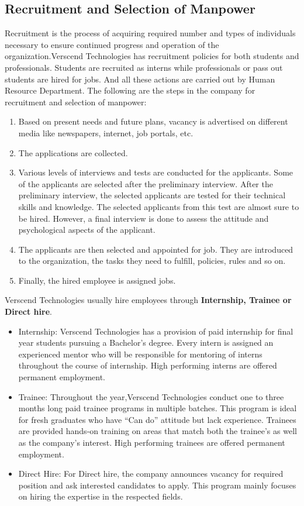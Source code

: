 \subsection{Recruitment and Selection of Manpower}
Recruitment is the process of acquiring required number and types of individuals necessary to ensure
continued progress and operation of the organization.Verscend Technologies has recruitment
policies for both students and professionals. Students are recruited as interns while professionals or pass out
students are hired for jobs. And all these actions are carried out by Human Resource Department. The
following are the steps in the company for recruitment and selection of manpower:
\begin{enumerate}
\item  Based on present needs and future plans, vacancy is advertised on different media like newspapers,
internet, job portals, etc.
\item  The applications are collected.
\item  Various levels of interviews and tests are conducted for the applicants. Some of the applicants are
selected after the preliminary interview. After the preliminary interview, the selected applicants are
tested for their technical skills and knowledge. The selected applicants from this test are almost sure
to be hired. However, a final interview is done to assess the attitude and psychological aspects of
the applicant.
\item  The applicants are then selected and appointed for job. They are introduced to the organization, the
tasks they need to fulfill, policies, rules and so on.
\item  Finally, the hired employee is assigned jobs.
\end{enumerate}
Verscend Technologies usually hire employees through \textbf{Internship, Trainee or Direct hire}.
\begin{itemize}
\item Internship: Verscend Technologies has a provision of paid internship for final year students
pursuing a Bachelor's degree. Every intern is assigned an experienced mentor who will be responsible
for mentoring of interns throughout the course of internship. High performing interns are offered
permanent employment.

\item Trainee: Throughout the year,Verscend Technologies conduct one to three months long
paid trainee programs in multiple batches. This program is ideal for fresh graduates who have “Can
do” attitude but lack experience. Trainees are provided hands-on training on areas that match both the
trainee’s as well as the company’s interest. High performing trainees are offered permanent
employment.

\item Direct Hire: For Direct hire, the company announces vacancy for required position and ask interested
candidates to apply. This program mainly focuses on hiring the expertise in the respected fields.
\end{itemize}
